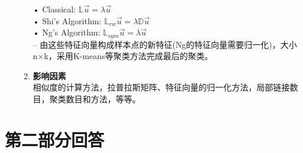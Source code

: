 \documentclass[a4paper,11pt,onecolumn,oneside,UTF8]{article}
\begin{document}
\begin{enumerate}
\begin{enumerate}[(1)]
                        \quad • Classical: $\mathbb{L}\vec{u} =  \lambda \vec{u}$\\
                        \quad • Shi's Algorithm: $\mathbb{L}_{rw}\vec{u} =  \lambda \mathbb{D}\vec{u}$\\
                        \quad • Ng's Algorithm: $\mathbb{L}_{sym}\vec{u} =  \lambda \vec{u}$\\
                        – 由这些特征向量构成样本点的新特征(Ng的特征向量需要归一化)，大小n×k，采用K-means等聚类方法完成最后的聚类。
                  \item \textbf{影响因素}\\
                        相似度的计算方法，拉普拉斯矩阵、特征向量的归一化方法，局部链接数目，聚类数目和方法，等等。
            \end{enumerate}
\end{enumerate}

\section*{第二部分回答}
\end{document}
